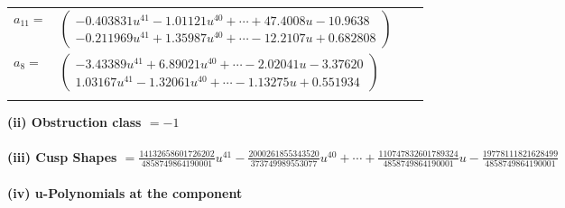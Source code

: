 \documentclass[1p]{elsarticle_modified}
\theoremstyle{definition}
\begin{document}
\begin{tabular}{m{7pt} m{180pt} m{7pt} m{180pt} }
\flushright $a_{11}=$&$\begin{pmatrix}-0.403831 u^{41}-1.01121 u^{40}+\cdots+47.4008 u-10.9638\\-0.211969 u^{41}+1.35987 u^{40}+\cdots-12.2107 u+0.682808\end{pmatrix}$ \\
\flushright $a_{8}=$&$\begin{pmatrix}-3.43389 u^{41}+6.89021 u^{40}+\cdots-2.02041 u-3.37620\\1.03167 u^{41}-1.32061 u^{40}+\cdots-1.13275 u+0.551934\end{pmatrix}$\\&\end{tabular}
\flushleft \textbf{(ii) Obstruction class $= -1$}\\~\\
\flushleft \textbf{(iii) Cusp Shapes $= \frac{14132658601726202}{4858749864190001} u^{41}-\frac{2000261855343520}{373749989553077} u^{40}+\cdots+\frac{110747832601789324}{4858749864190001} u-\frac{19778111821628499}{4858749864190001}$}\\~\\
\newpage\renewcommand{\arraystretch}{1}
\flushleft \textbf{(iv) u-Polynomials at the component}\newline \\
\end{document}
